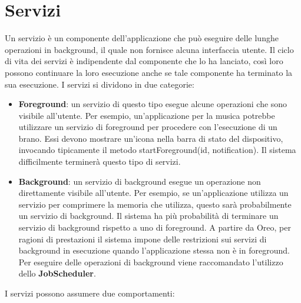 \section{Servizi}
Un servizio è un componente dell'applicazione che può eseguire delle lunghe operazioni in background, il quale non fornisce alcuna interfaccia utente. Il ciclo di vita dei servizi è indipendente dal componente che lo ha lanciato, così loro possono continuare la loro esecuzione anche se tale componente ha terminato la sua esecuzione. I servizi si dividono in due categorie:
\begin{itemize}
\item \textbf{Foreground}: un servizio di questo tipo esegue alcune operazioni che sono visibile all'utente. Per esempio, un'applicazione per la musica potrebbe utilizzare un servizio di foreground per procedere con l'esecuzione di un brano. Essi devono mostrare un'icona nella barra di stato del dispositivo, invocando tipicamente il metodo startForeground(id, notification). Il sistema difficilmente terminerà questo tipo di servizi.
\item \textbf{Background}: un servizio di background esegue un operazione non direttamente visibile all'utente. Per esempio, se un'applicazione utilizza un servizio per comprimere la memoria che utilizza, questo sarà probabilmente un servizio di background. Il sistema ha più probabilità di terminare un servizio di background rispetto a uno di foreground. A partire da Oreo, per ragioni di prestazioni il sistema impone delle restrizioni sui servizi di background in esecuzione quando l'applicazione stessa non è in foreground. Per eseguire delle operazioni di background viene raccomandato l'utilizzo dello \textbf{JobScheduler}.
\end{itemize}
I servizi possono assumere due comportamenti:
